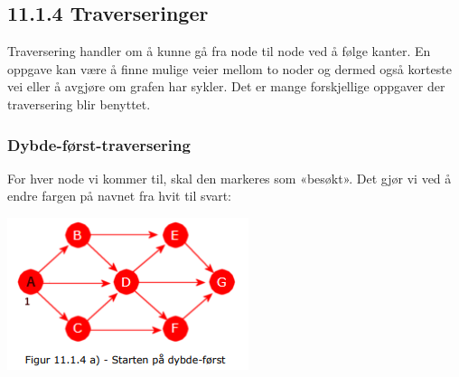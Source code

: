\documentclass[11pt]{article}
\begin{document}
    \subsection{11.1.4 Traverseringer}
        Traversering handler om å kunne gå fra node til node ved å følge kanter. En oppgave kan
        være å finne mulige veier mellom to noder og dermed også korteste vei eller å avgjøre om
        grafen har sykler. Det er mange forskjellige oppgaver der traversering blir benyttet. 

        \subsubsection{Dybde-først-traversering}

            \begin{multicols}{2}
                For hver node vi kommer til, skal den markeres som «besøkt».
                Det gjør vi ved å endre fargen på navnet fra hvit til svart: 

                \columnbreak

                \includegraphics[center]{f-11.1.4a.png}
            \end{multicols}
\end{document}
